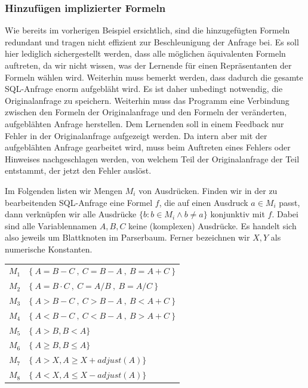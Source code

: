 \subsubsection{Hinzufügen implizierter Formeln}
\label{subsubsec:implicitformulas}

Wie bereits im vorherigen Beispiel ersichtlich, sind die hinzugefügten Formeln redundant und tragen nicht effizient zur Beschleunigung der Anfrage bei. Es soll hier lediglich sichergestellt werden, dass alle möglichen äquivalenten Formeln auftreten, da wir nicht wissen, was der Lernende für einen Repräsentanten der Formeln wählen wird. Weiterhin muss bemerkt werden, dass dadurch die gesamte SQL-Anfrage enorm aufgebläht wird. Es ist daher unbedingt notwendig, die Originalanfrage zu speichern. Weiterhin muss das Programm eine Verbindung zwischen den Formeln der Originalanfrage und den Formeln der veränderten, aufgeblähten Anfrage herstellen. Dem Lernenden soll in einem Feedback nur Fehler in der Originalanfrage aufgezeigt werden. Da intern aber mit der aufgeblähten Anfrage gearbeitet wird, muss beim Auftreten eines Fehlers oder Hinweises nachgeschlagen werden, von welchem Teil der Originalanfrage der Teil entstammt, der jetzt den Fehler auslöst.

Im Folgenden listen wir Mengen $M_i$ von Ausdrücken. Finden wir in der zu bearbeitenden SQL-Anfrage eine Formel $f$, die auf einen Ausdruck $a\in M_i$ passt, dann verknüpfen wir alle Ausdrücke $\{b : b\in M_i \wedge b \neq a\}$ konjunktiv mit $f$. Dabei sind alle Variablennamen $A,B,C$ keine (komplexen) Ausdrücke. Es handelt sich also jeweils um Blattknoten im Parserbaum. Ferner bezeichnen wir $X,Y$ als numerische Konstanten.\\

\begin{tabular}{ll}
$M_1$ & $\{\ A=B-C\ ,\ C=B-A\ ,\ B=A+C\ \}$\\
$M_2$ & $\{\ A=B\cdot C\ ,\ C=A / B\ ,\ B=A / C\ \}$\\
$M_3$ & $\{\ A>B-C\ ,\ C>B-A\ ,\ B<A+C\ \}$\\
$M_4$ & $\{\ A<B-C\ ,\ C<B-A\ ,\ B>A+C\ \}$\\
$M_5$ & $\{\ A>B, B<A \}$\\
$M_6$ & $\{\ A\geq B, B\leq A \}$\\
$M_7$ & $\{\ A>X, A\geq X+\mathit{adjust}(A) \}$\\
$M_8$ & $\{\ A<X, A\leq X-\mathit{adjust}(A) \}$\\

\end{tabular}

